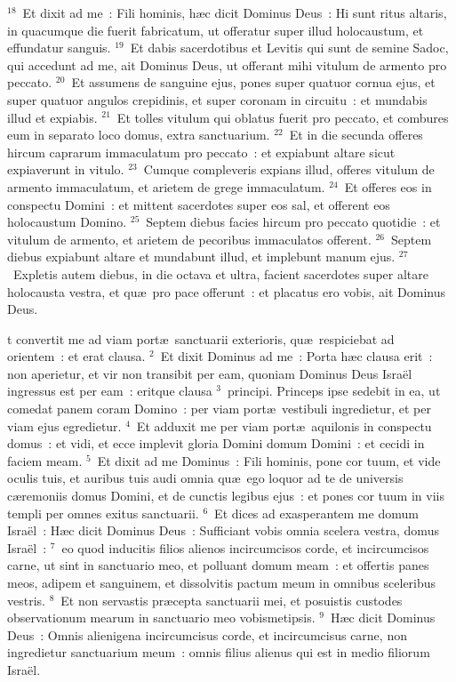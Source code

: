 ${}^{18}$~Et dixit ad me~: Fili hominis, h\ae c dicit Dominus Deus~: Hi sunt ritus altaris, in quacumque die fuerit fabricatum, ut offeratur super illud holocaustum, et effundatur sanguis.
${}^{19}$~Et dabis sacerdotibus et Levitis qui sunt de semine Sadoc, qui accedunt ad me, ait Dominus Deus, ut offerant mihi vitulum de armento pro peccato.
${}^{20}$~Et assumens de sanguine ejus, pones super quatuor cornua ejus, et super quatuor angulos crepidinis, et super coronam in circuitu~: et mundabis illud et expiabis.
${}^{21}$~Et tolles vitulum qui oblatus fuerit pro peccato, et combures eum in separato loco domus, extra sanctuarium.
${}^{22}$~Et in die secunda offeres hircum caprarum immaculatum pro peccato~: et expiabunt altare sicut expiaverunt in vitulo.
${}^{23}$~Cumque compleveris expians illud, offeres vitulum de armento immaculatum, et arietem de grege immaculatum.
${}^{24}$~Et offeres eos in conspectu Domini~: et mittent sacerdotes super eos sal, et offerent eos holocaustum Domino.
${}^{25}$~Septem diebus facies hircum pro peccato quotidie~: et vitulum de armento, et arietem de pecoribus immaculatos offerent.
${}^{26}$~Septem diebus expiabunt altare et mundabunt illud, et implebunt manum ejus.
${}^{27}$~Expletis autem diebus, in die octava et ultra, facient sacerdotes super altare holocausta vestra, et qu\ae\ pro pace offerunt~: et placatus ero vobis, ait Dominus Deus.

\bchapter
{}t convertit me ad viam port\ae\ sanctuarii exterioris, qu\ae\ respiciebat ad orientem~: et erat clausa.
${}^{2}$~Et dixit Dominus ad me~: Porta h\ae c clausa erit~: non aperietur, et vir non transibit per eam, quoniam Dominus Deus Isra\"el ingressus est per eam~: eritque clausa
${}^{3}$~principi. Princeps ipse sedebit in ea, ut comedat panem coram Domino~: per viam port\ae\ vestibuli ingredietur, et per viam ejus egredietur.
${}^{4}$~Et adduxit me per viam port\ae\ aquilonis in conspectu domus~: et vidi, et ecce implevit gloria Domini domum Domini~: et cecidi in faciem meam.
${}^{5}$~Et dixit ad me Dominus~: Fili hominis, pone cor tuum, et vide oculis tuis, et auribus tuis audi omnia qu\ae\ ego loquor ad te de universis c\ae remoniis domus Domini, et de cunctis legibus ejus~: et pones cor tuum in viis templi per omnes exitus sanctuarii.
${}^{6}$~Et dices ad exasperantem me domum Isra\"el~: H\ae c dicit Dominus Deus~: Sufficiant vobis omnia scelera vestra, domus Isra\"el~:
${}^{7}$~eo quod inducitis filios alienos incircumcisos corde, et incircumcisos carne, ut sint in sanctuario meo, et polluant domum meam~: et offertis panes meos, adipem et sanguinem, et dissolvitis pactum meum in omnibus sceleribus vestris.
${}^{8}$~Et non servastis pr\ae cepta sanctuarii mei, et posuistis custodes observationum mearum in sanctuario meo vobismetipsis.
${}^{9}$~H\ae c dicit Dominus Deus~: Omnis alienigena incircumcisus corde, et incircumcisus carne, non ingredietur sanctuarium meum~: omnis filius alienus qui est in medio filiorum Isra\"el.


